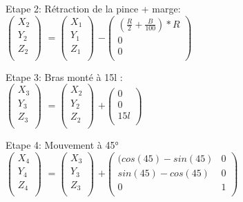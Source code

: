 Etape 2: Rétraction de la pince + marge: \\

$
\begin{pmatrix}
  X_{2} \\
  Y_{2} \\
  Z_{2} \\
\end{pmatrix}
$
\vspace{5mm} %
$
=
\begin{pmatrix}
  X_{1} \\
  Y_{1} \\
  Z_{1} \\
\end{pmatrix}
$
\vspace{5mm} %
$
 -
\begin{pmatrix}
 (\frac{R}{2} + \frac{B}{100})*R  \\
  0 \\
  0 \\
\end{pmatrix}
$

Etape 3: Bras monté à 15l : \\

$
\begin{pmatrix}
  X_{3} \\
  Y_{3} \\
  Z_{3} \\
\end{pmatrix}
$
\vspace{5mm} %
$
=
\begin{pmatrix}
  X_{2} \\
  Y_{2} \\
  Z_{2} \\
\end{pmatrix}
$
\vspace{5mm} %
$
 +
\begin{pmatrix}
  0 \\
  0 \\
  15l \\
\end{pmatrix}
$

Etape 4: Mouvement à 45° \\

$
\begin{pmatrix}
  X_{4} \\
  Y_{4} \\
  Z_{4} \\
\end{pmatrix}
$
\vspace{5mm} %
$
=
\begin{pmatrix}
  X_{3} \\
  Y_{3} \\
  Z_{3} \\
\end{pmatrix}
$
\vspace{5mm} %
$
 +
\begin{pmatrix}
 (cos(45)-sin(45) & 0 \\
  sin(45)-cos(45) & 0\\
  0 & 1 \\
\end{pmatrix}
$

